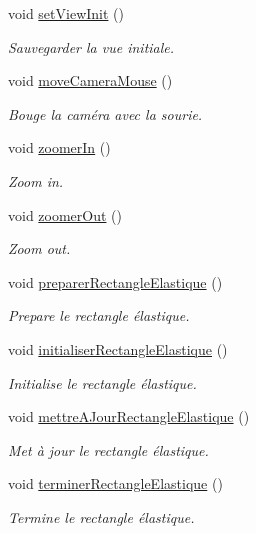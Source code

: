 \begin{DoxyCompactItemize}
void \hyperlink{group__inf2990_gab3bc1f3520b17ed3d19287f3d411dd82}{set\+View\+Init} ()
\begin{DoxyCompactList}\small\item\em Sauvegarder la vue initiale. \end{DoxyCompactList}\item 
void \hyperlink{group__inf2990_gaba7107809948a77f8ef3bf2240bc2bc4}{move\+Camera\+Mouse} ()
\begin{DoxyCompactList}\small\item\em Bouge la caméra avec la sourie. \end{DoxyCompactList}\item 
void \hyperlink{group__inf2990_ga8f027fa8ccba48bada7b91b1bc32ed96}{zoomer\+In} ()
\begin{DoxyCompactList}\small\item\em Zoom in. \end{DoxyCompactList}\item 
void \hyperlink{group__inf2990_gaa2e1aeaa2fd10b16cf8b5f406d6270c8}{zoomer\+Out} ()
\begin{DoxyCompactList}\small\item\em Zoom out. \end{DoxyCompactList}\item 
void \hyperlink{group__inf2990_gaa5ea001f334158926e6c701478926ae9}{preparer\+Rectangle\+Elastique} ()
\begin{DoxyCompactList}\small\item\em Prepare le rectangle élastique. \end{DoxyCompactList}\item 
void \hyperlink{group__inf2990_ga6ccf25bd92d3bae6dfeebaf051c768f4}{initialiser\+Rectangle\+Elastique} ()
\begin{DoxyCompactList}\small\item\em Initialise le rectangle élastique. \end{DoxyCompactList}\item 
void \hyperlink{group__inf2990_ga382ae0540038d9ef65673af9d5d1b164}{mettre\+A\+Jour\+Rectangle\+Elastique} ()
\begin{DoxyCompactList}\small\item\em Met à jour le rectangle élastique. \end{DoxyCompactList}\item 
void \hyperlink{group__inf2990_ga1c99d4d88f05b70a20b36b51c07f31cf}{terminer\+Rectangle\+Elastique} ()
\begin{DoxyCompactList}\small\item\em Termine le rectangle élastique. \end{DoxyCompactList}\item 

\end{DoxyCompactItemize}
